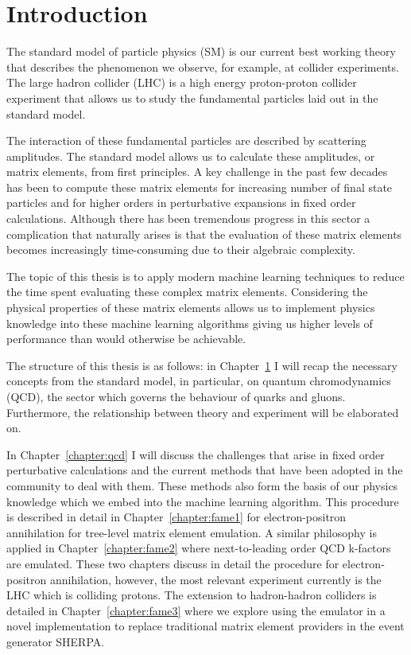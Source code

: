 \documentclass[main.tex]{subfiles}
\begin{document}
\chapter{Introduction}
\label{chapter:intro}
The standard model of particle physics (SM) is our current best working
theory that describes the phenomenon we observe, for  example,
 at collider experiments.
The large hadron collider (LHC) is a high energy proton-proton
collider experiment that allows us to study the fundamental particles
laid out in the standard model.

The interaction of these fundamental particles are described
by scattering amplitudes. The standard model allows us to
calculate these amplitudes, or matrix elements, from first
principles. A key challenge in the past few decades has been
to compute these matrix elements for increasing number of
final state particles and for higher orders in perturbative
expansions in fixed order calculations. Although there
has been tremendous progress in this sector a complication
that naturally arises is that the evaluation of these matrix
elements becomes increasingly time-consuming due to their
algebraic complexity.

The topic of this thesis is to apply modern machine learning
techniques to reduce the time spent evaluating these
complex matrix elements. Considering the physical properties
of these matrix elements allows us to implement physics
knowledge into these machine learning algorithms giving
us higher levels of performance than would otherwise be
achievable.

The structure of this thesis is as follows: in Chapter~\ref{chapter:intro}
I will recap the necessary concepts from the standard
model, in particular, on quantum chromodynamics (QCD), the sector
which governs the behaviour of quarks and gluons. Furthermore,
the relationship between theory and experiment will be elaborated on.

In Chapter~\ref{chapter:qcd} I will discuss the challenges that arise
in fixed order perturbative calculations and the current methods
that have been adopted in the community to deal with them. These
methods also form the basis of our physics knowledge which we
embed into the machine learning algorithm. This procedure is 
described in detail in Chapter~\ref{chapter:fame1} for electron-positron
annihilation for tree-level matrix element emulation.
A similar philosophy is applied in Chapter~\ref{chapter:fame2}
where next-to-leading order QCD k-factors are emulated.
These two chapters discuss in detail the procedure for
electron-positron annihilation, however, the most relevant
experiment currently is the LHC which is colliding protons.
The extension to hadron-hadron colliders is detailed in
Chapter~\ref{chapter:fame3} where we explore using the
emulator in a novel implementation to replace traditional
matrix element providers in the event generator SHERPA.
\end{document}
